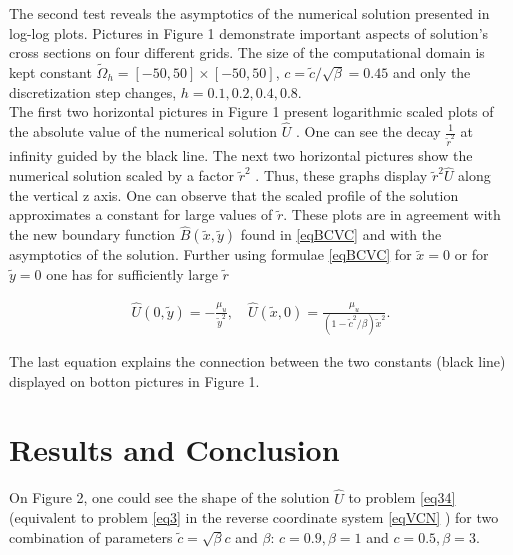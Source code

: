 \documentclass[12pt]{article}
\theoremstyle{theorem}
\theoremstyle{defi}
\begin{document}
The second test reveals the asymptotics of the numerical solution presented in log-log plots. Pictures in Figure 1 demonstrate important aspects of solution's cross sections on four different grids. The size of the computational domain is kept constant  $\tilde \Omega_h = [-50, 50]\times[-50, 50]$, $c = \tilde c / \sqrt \beta = 0.45$ and only the discretization step changes, $h = 0.1, 0.2, 0.4, 0.8$.  \\



The first two horizontal pictures in Figure 1 present logarithmic scaled plots of the absolute value of the numerical solution $\widehat{U}$  . One can see the decay $\frac{1}{\tilde r^2}$  at infinity guided by the black line. The next two horizontal pictures show the numerical solution scaled by a factor $\tilde r^2$  . Thus, these graphs display  $\tilde r^2\widehat{U}$  along the vertical z axis. One can observe that the scaled profile of the solution approximates a constant for large values of $ \tilde r$.  These plots are in agreement with the new boundary function $\widehat B(\tilde{x} , \tilde y)$ found in \eqref{eqBCVC} and with the asymptotics of the solution. Further using formulae \eqref{eqBCVC}  for $\tilde x = 0$ or for $\tilde y = 0$ one has for sufficiently large $ \tilde r $

\begin{equation}\label{eqCross}
\begin{split}
\widehat{U}(0,\tilde y) = - \frac{\mu_u}{\tilde y^2}, \quad \widehat{U}(\tilde x,0) = \frac{\mu_u}{(1 - \tilde c^2/\beta )\tilde x^2}.
\end{split}
\end{equation}

The last equation explains the connection between the two constants (black line) displayed on botton pictures in Figure 1.


\section{Results and Conclusion}
On Figure 2, one could see the shape of the solution $\widehat U$ to problem  \eqref{eq34} (equivalent to problem \eqref{eq3} in the reverse coordinate system \eqref{eqVCN}  ) for two combination of parameters $\tilde  c = \sqrt \beta c$ and $\beta$:
$c = 0.9, \beta = 1$ and $c = 0.5, \beta = 3$.
\end{document}
